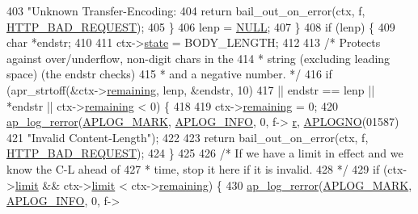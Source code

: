 \begin{DoxyCode}
{403                               \textcolor{stringliteral}{"Unknown Transfer-Encoding: %
404                 \textcolor{keywordflow}{return} bail\_out\_on\_error(ctx, f, \hyperlink{group__HTTP__Status_ga0c1fdbbb10800664989907cbd3a5a023}{HTTP\_BAD\_REQUEST});
405             \}
406             lenp = \hyperlink{pcre_8txt_ad7f989d16aa8ca809a36bc392c07fba1}{NULL};
407         \}
408         \textcolor{keywordflow}{if} (lenp) \{
409             \textcolor{keywordtype}{char} *endstr;
410 
411             ctx->\hyperlink{structhttp__filter__ctx_a2e84a1c737dd4daa565b328c875402cb}{state} = BODY\_LENGTH;
412 
413             \textcolor{comment}{/* Protects against over/underflow, non-digit chars in the}
414 \textcolor{comment}{             * string (excluding leading space) (the endstr checks)}
415 \textcolor{comment}{             * and a negative number. */}
416             \textcolor{keywordflow}{if} (apr\_strtoff(&ctx->\hyperlink{structhttp__filter__ctx_a669e4805b3738b515c0bc6d56f0f7ea7}{remaining}, lenp, &endstr, 10)
417                 || endstr == lenp || *endstr || ctx->\hyperlink{structhttp__filter__ctx_a669e4805b3738b515c0bc6d56f0f7ea7}{remaining} < 0) \{
418 
419                 ctx->\hyperlink{structhttp__filter__ctx_a669e4805b3738b515c0bc6d56f0f7ea7}{remaining} = 0;
420                 \hyperlink{group__APACHE__CORE__LOG_ga4c112558ccffd6b363da102b2052d2a6}{ap\_log\_rerror}(\hyperlink{group__APACHE__CORE__LOG_ga655e126996849bcb82e4e5a14c616f4a}{APLOG\_MARK}, \hyperlink{group__APACHE__CORE__LOG_ga47fafbef7e478babdd92e90407f95b19}{APLOG\_INFO}, 0, f->
      \hyperlink{structap__filter__t_a2d6537780c4059697c1f168a1121d62c}{r}, \hyperlink{group__APACHE__CORE__LOG_ga1dee8a07e06bc5b3de8b89662c2cd666}{APLOGNO}(01587)
421                               \textcolor{stringliteral}{"Invalid Content-Length"});
422 
423                 \textcolor{keywordflow}{return} bail\_out\_on\_error(ctx, f, \hyperlink{group__HTTP__Status_ga0c1fdbbb10800664989907cbd3a5a023}{HTTP\_BAD\_REQUEST});
424             \}
425 
426             \textcolor{comment}{/* If we have a limit in effect and we know the C-L ahead of}
427 \textcolor{comment}{             * time, stop it here if it is invalid.}
428 \textcolor{comment}{             */}
429             \textcolor{keywordflow}{if} (ctx->\hyperlink{structhttp__filter__ctx_ae3dfd19fe37ee4d2d690ca352f6d8601}{limit} && ctx->\hyperlink{structhttp__filter__ctx_ae3dfd19fe37ee4d2d690ca352f6d8601}{limit} < ctx->\hyperlink{structhttp__filter__ctx_a669e4805b3738b515c0bc6d56f0f7ea7}{remaining}) \{
430                 \hyperlink{group__APACHE__CORE__LOG_ga4c112558ccffd6b363da102b2052d2a6}{ap\_log\_rerror}(\hyperlink{group__APACHE__CORE__LOG_ga655e126996849bcb82e4e5a14c616f4a}{APLOG\_MARK}, \hyperlink{group__APACHE__CORE__LOG_ga47fafbef7e478babdd92e90407f95b19}{APLOG\_INFO}, 0, f->
}}
\end{DoxyCode}
